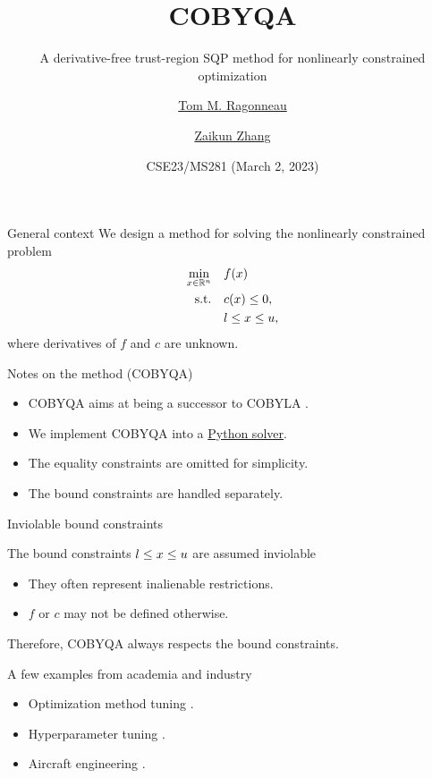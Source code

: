 \documentclass[
]{presentation}
\title{COBYQA}
\subtitle{A derivative-free trust-region SQP method for nonlinearly constrained optimization}
\date{CSE23/MS281 (March 2, 2023)}
\author{\href{https://www.tomragonneau.com/}{Tom M. Ragonneau} \and \href{https://www.zhangzk.net/}{Zaikun Zhang}}
\institute{
    Department of Applied Mathematics\\
    The Hong Kong Polytechnic University
}
\newcommand{\obj}{f}
\newcommand{\con}{c}
\newcommand{\iter}[1][]{x\ifblank{#1}{}{^{#1}}}
\newcommand{\xl}{l}
\newcommand{\xu}{u}
\begin{document}
\maketitle

\begin{frame}{General context}
    We design a method for solving the nonlinearly constrained problem
    \begin{align*}
        \min_{\iter \in \R^n}   & \quad \obj(\iter)\\
        \mathrm{s.t.}           & \quad \con(\iter) \le 0,\\
                                & \quad \xl \le \iter \le \xu,
    \end{align*}
    where derivatives of $\obj$ and $\con$ are \alert{unknown}.

    \medskip

    \begin{block}{Notes on the method (COBYQA)}
        \begin{itemize}
            \item COBYQA aims at being a \alert{successor} to COBYLA \parencite{Powell_1994}.
            \item We \alert{implement} COBYQA into a \href{https://pypi.org/project/cobyqa/}{Python solver}.
            \item The equality constraints are omitted for simplicity.
            \item The bound constraints are handled \alert{separately}.
        \end{itemize}
    \end{block}
\end{frame}

\begin{frame}{Inviolable bound constraints}
    \begin{block}{The bound constraints $\xl \le \iter \le \xu$ are assumed inviolable}
        \begin{itemize}
            \item They often represent \alert{inalienable} restrictions.
            \item $\obj$ or $\con$ may not be defined otherwise.
        \end{itemize}
    \end{block}

    \medskip

    Therefore, COBYQA \alert{always} respects the bound constraints.

    \medskip

    \begin{block}{A few examples from academia and industry}
        \begin{itemize}
            \item Optimization method tuning \parencite{Audet_Orban_2006}.
            \item Hyperparameter tuning \parencite{Ghanbari_Scheinberg_2017}.
            \item Aircraft engineering \parencite{Gazaix_Etal_2019}.
        \end{itemize}
    \end{block}
\end{frame}
\end{document}
